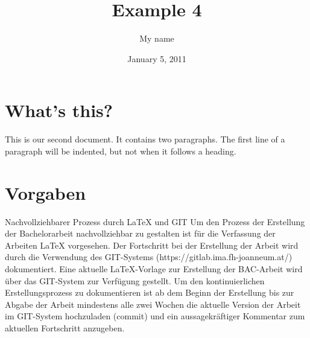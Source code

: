 \documentclass[a4paper,11pt]{article}
\begin{document}
 
\title{Example 4} 
\author{My name} 
\date{January 5, 2011} 
\maketitle 
\section{What's this?} 
This is our 
second document. 
It contains two paragraphs. The first line of a paragraph will be 
indented, but not when it follows a heading. 
\section{Vorgaben}
Nachvollziehbarer Prozess durch LaTeX und GIT
Um den Prozess der Erstellung der Bachelorarbeit nachvollziehbar zu gestalten ist für die Verfassung der Arbeiten LaTeX vorgesehen. Der Fortschritt bei der Erstellung der Arbeit wird durch die Verwendung des GIT-Systems (https://gitlab.ima.fh-joanneum.at/) dokumentiert. 
Eine aktuelle LaTeX-Vorlage zur Erstellung der BAC-Arbeit wird über das GIT-System zur Verfügung gestellt. Um den kontinuierlichen Erstellungsprozess zu dokumentieren ist ab dem Beginn der Erstellung bis zur Abgabe der Arbeit mindestens alle zwei Wochen die aktuelle Version der Arbeit im GIT-System hochzuladen (commit) und ein aussagekräftiger Kommentar zum aktuellen Fortschritt anzugeben.

\end{document}
